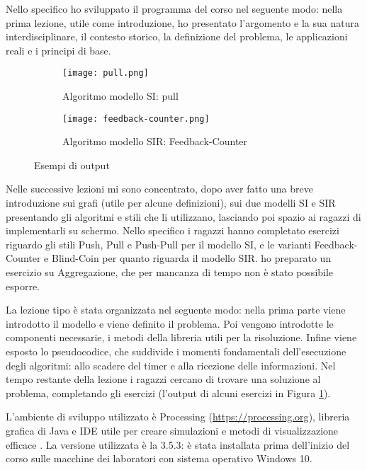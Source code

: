 Nello specifico ho sviluppato il programma del corso nel seguente modo: nella prima lezione, utile come introduzione, ho presentato l’argomento e la sua natura interdisciplinare, il contesto storico, la definizione del problema, le applicazioni reali e i principi di base.
\begin{figure}[!ht]
    
    \begin{subfigure}{.5\textwidth}
        \centering
        \texttt{[image: pull.png]}
        \captionsetup{justification=centering}
        \caption{Algoritmo modello SI: pull} 
    \end{subfigure}\hfill
    \begin{subfigure}{.5\textwidth}
        \centering
        \texttt{[image: feedback-counter.png]}
        \captionsetup{justification=centering}
        \caption{Algoritmo modello SIR: Feedback-Counter} 
    \end{subfigure}
    \caption{Esempi di output}
    \label{fig:output}
\end{figure} 

Nelle successive lezioni mi sono concentrato, dopo aver fatto una breve introduzione sui grafi (utile per alcune definizioni), sui due modelli SI e SIR presentando gli algoritmi e stili che li utilizzano, lasciando poi spazio ai ragazzi di implementarli su schermo. Nello specifico i ragazzi hanno completato esercizi riguardo gli stili Push, Pull e Push-Pull per il modello SI, e le varianti Feedback-Counter e Blind-Coin per quanto riguarda il modello SIR. ho preparato un esercizio su Aggregazione, che per mancanza di tempo non è stato possibile esporre.

La lezione tipo è stata organizzata nel seguente modo: nella prima parte viene introdotto il modello e viene definito il problema. Poi vengono introdotte le componenti necessarie, i metodi della libreria utili per la risoluzione. Infine viene esposto lo pseudocodice, che suddivide i momenti fondamentali dell'esecuzione degli algoritmi: allo scadere del timer e alla ricezione delle informazioni. Nel tempo restante della lezione i ragazzi cercano di trovare una soluzione al problema, completando gli esercizi (l'output di alcuni esercizi in Figura \ref{fig:output}).

L’ambiente di sviluppo utilizzato è Processing (\href{https://processing.org}{https://processing.org}), libreria grafica di Java e IDE utile per creare simulazioni e metodi di visualizzazione efficace \cite{processing_wikipedia}. La versione utilizzata è la 3.5.3: è stata installata prima dell'inizio del corso sulle macchine dei laboratori con sistema operativo Windows 10.

